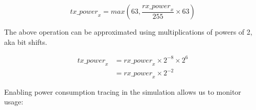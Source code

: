 \documentclass{article}
\begin{document}
$$
\mathit{tx\_power}_x = max(63, \frac{\mathit{rx\_power}_x} {255} \times 63)
$$

The above operation can be approximated using multiplications of powers of 2, aka bit shifts.

\begin{align*}
\mathit{tx\_power}_x
&= \mathit{rx\_power}_x \times 2^{-8} \times 2^6 \\
&= \mathit{rx\_power}_x \times 2^{-2}
\end{align*}

Enabling power consumption tracing in the simulation allows us to monitor usage:

\end{document}
